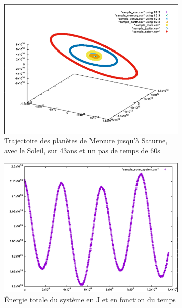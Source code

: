 \documentclass[11pt]{article}
\begin{document}
\begin{figure}[H]
\begin{subfigure}{0.5\textwidth}
\includegraphics[width=1\linewidth]{43y.png} 
\caption{Trajectoire des planètes de Mercure jusqu'à Saturne, avec le Soleil, sur 43ans et un pas de temps de 60s}
\label{fig:asubim1}
\end{subfigure}
\begin{subfigure}{0.5\textwidth}
\includegraphics[width=1\linewidth]{43y tot energy.png}
\caption{Énergie totale du système en J et en fonction du temps}
\label{fig:bsubim2}
\end{subfigure}
\begin{subfigure}{0.5\textwidth}

\end{subfigure}
\end{figure}
\end{document}
